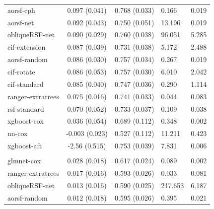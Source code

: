 \documentclass[twoside,11pt]{article}\usepackage[]{graphicx}\usepackage[]{xcolor}
\newenvironment{knitrout}{}{} %
\begin{document}
\begin{knitrout}
\begin{longtable}[t]{lcclc}
\hspace{1em}aorsf-cph & 0.097 (0.041) & 0.768 (0.033) & 0.166 & 0.019\\
\hspace{1em}aorsf-net & 0.092 (0.043) & 0.750 (0.051) & 13.196 & 0.019\\
\hspace{1em}obliqueRSF-net & 0.090 (0.029) & 0.760 (0.038) & 96.051 & 5.285\\
\hspace{1em}cif-extension & 0.087 (0.039) & 0.731 (0.038) & 5.172 & 2.488\\
\hspace{1em}aorsf-random & 0.086 (0.030) & 0.757 (0.034) & 0.267 & 0.019\\
\hspace{1em}cif-rotate & 0.086 (0.053) & 0.757 (0.030) & 6.010 & 2.042\\
\hspace{1em}cif-standard & 0.085 (0.040) & 0.747 (0.036) & 0.290 & 1.114\\
\hspace{1em}ranger-extratrees & 0.075 (0.016) & 0.741 (0.033) & 0.044 & 0.083\\
\hspace{1em}rsf-standard & 0.070 (0.052) & 0.733 (0.037) & 0.109 & 0.038\\
\hspace{1em}xgboost-cox & 0.036 (0.054) & 0.689 (0.112) & 0.348 & 0.002\\
\hspace{1em}nn-cox & -0.003 (0.023) & 0.527 (0.112) & 11.211 & 0.423\\
\hspace{1em}xgboost-aft & -2.56 (0.515) & 0.753 (0.039) & 7.831 & 0.006\\
\addlinespace[0.3em]
\hline
\multicolumn{5}{l}{\textit{\textbf{FCL; relapse, n = 541, p = 7}}}\\
\hline
\hspace{1em}glmnet-cox & 0.028 (0.018) & 0.617 (0.024) & 0.089 & 0.002\\
\hspace{1em}ranger-extratrees & 0.017 (0.016) & 0.593 (0.026) & 0.033 & 0.081\\
\hspace{1em}obliqueRSF-net & 0.013 (0.016) & 0.590 (0.025) & 217.653 & 6.187\\
\hspace{1em}aorsf-random & 0.012 (0.018) & 0.595 (0.026) & 0.395 & 0.021\\

\end{longtable}
\end{knitrout}
\end{document}
